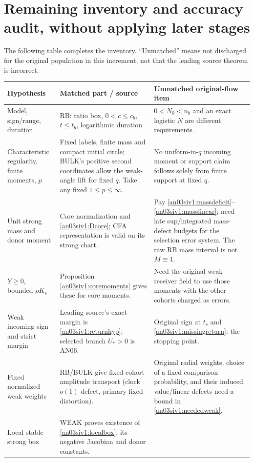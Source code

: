 \documentclass[11pt]{article}
\numberwithin{equation}{section}
\theoremstyle{remark}\newtheorem{remark}[proposition]{Remark}
\begin{document}
\section{Remaining inventory and accuracy audit, without applying later stages}
\label{an03siv1:remaining}
The following table completes the inventory. ``Unmatched'' means
not discharged for the original population in this increment, not
that the leading source theorem is incorrect.
\begin{longtable}{>{\raggedright\arraybackslash}p{}
 >{\raggedright\arraybackslash}p{}
 >{\raggedright\arraybackslash}p{}}
\toprule
Hypothesis & Matched part / source & Unmatched original-flow item\\\midrule
Model, sign/range, duration & RB: ratio box, $0<c\le c_b$,
$t\le t_b$, logarithmic duration & $0<N_0<n_b$ and an exact logistic
$N$ are different requirements.\\[4pt]
Characteristic regularity, finite moments, $p$ & Fixed labels, finite
mass and compact initial circle; BULK's positive second coordinates
allow the weak-angle lift for fixed $q$. Take any fixed
$1\le p\le\infty$. & No uniform-in-$q$ incoming moment or support
claim follows solely from finite support at fixed $q$.\\[4pt]
Unit strong mass and donor moment & Core normalization and
\eqref{an03siv1:Dcore}; CFA representation is valid on its strong chart.
& Pay \eqref{an03siv1:massdeficit}--\eqref{an03siv1:masslinear}; need
late sup/integrated mass-defect budgets for the selection error system.
The raw RB mass interval is not $M\equiv1$.\\[4pt]
$Y\ge0$, bounded $\rho K_s$ & Proposition \ref{an03siv1:coremoments}
gives these for core moments. & Need the original weak receiver field
to use those moments with the other cohorts charged as errors.\\[4pt]
Weak incoming sign and strict margin & Leading source's exact margin
is \eqref{an03siv1:returnhyp}; selected branch $U_*>0$ is AN06.
& Original sign at $t_s$ and \eqref{an03siv1:missingreturn}: the
stopping point.\\[4pt]
Fixed normalized weak weights & RB/BULK give fixed-cohort amplitude
transport (clock $o(1)$ defect, primary fixed distortion).
& Original radial weights, choice of a fixed comparison probability,
and their induced value/linear defects need a bound in
\eqref{an03siv1:neededweak}.\\[4pt]
Local stable strong box & WEAK proves existence of
\eqref{an03siv1:localbox}, its negative Jacobian and donor constants.

\end{longtable}
\end{document}

